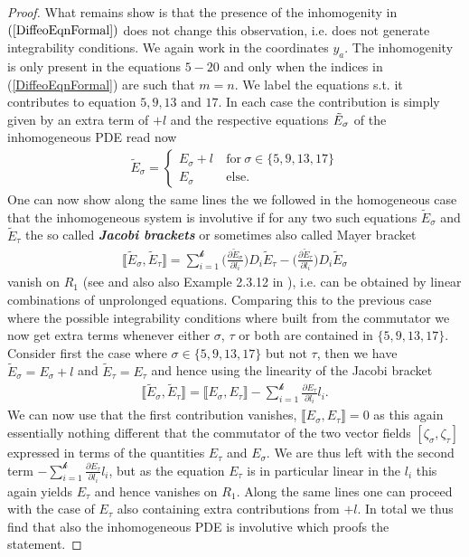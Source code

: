 \documentclass[a4paper,12pt, DIV=14, BCOR=5mm, twoside, headsepline, numbers=noenddot]{scrbook}
\begin{document}
\begin{proof}
What remains show is that the presence of the inhomogenity in $(\ref{DiffeoEqnFormal})$ does not change this observation, i.e. does not generate integrability conditions. We again work in the coordinates $y_a$. The inhomogenity is only present in the equations $5-20$ and only when the indices in (\ref{DiffeoEqnFormal}) are such that $m = n$. We label the equations s.t. it contributes to equation $5,9,13$ and $17$. In each case the contribution is simply given by an extra term of $+l$ and the respective equations $\Tilde{E}_{\sigma}$ of the inhomogeneous PDE read now 
\begin{align}
     \tilde{E}_{\sigma} = \begin{cases}
     E_{\sigma} + l \ &\text{for} \ \sigma \in \{ 5,9,13,17 \}\\
     E_{\sigma} \ &\text{else}.
     \end{cases}
\end{align}
One can now show along the same lines the we followed in the homogeneous case that the inhomogeneous system is involutive if for any two such equations $\tilde{E}_{\sigma}$ and $\tilde{E}_{\tau}$ the so called \textit{\textbf{Jacobi brackets}} or sometimes also called Mayer bracket 
\begin{align}
  \llbracket \tilde{E}_{\sigma}, \tilde{E}_{\tau} \rrbracket = \sum _{i = 1}^{\mathcal{k}} \biggl(\frac{\partial \tilde{E}_{\sigma}}{\partial l_i}\biggr) D_{i}\tilde{E}_{\tau} -  \biggl(\frac{\partial \tilde{E}_{\tau}}{\partial l_i}\biggr) D_{i}\tilde{E}_{\sigma} 
\end{align}
vanish on $R_1$ (see  \cite{seiler1994analysis} and also also Example 2.3.12 in \cite{seiler2009involution}), i.e. can be obtained by linear combinations of unprolonged equations. Comparing this to the previous case where the possible integrability conditions where built from the commutator we now get extra terms whenever either $\sigma$, $\tau$ or both are contained in $\{ 5,9,13,17 \}$. Consider first the case where $\sigma \in \{5,9,13,17\}$ but not $\tau$, then we have $\tilde{E}_{\sigma} = E_{\sigma} + l$ and $\tilde{E}_{\tau} = E_{\tau}$ and hence using the linearity of the Jacobi bracket
\begin{align}
    \llbracket \tilde{E}_{\sigma}, \tilde{E}_{\tau} \rrbracket = \llbracket E_{\sigma}, E_{\tau} \rrbracket - \sum_{i=1}^{\mathcal{k}} \frac{\partial E_{\tau}}{\partial l_i} l_i.
\end{align}
We can now use that the first contribution vanishes, $\llbracket E_{\sigma}, E_{\tau} \rrbracket = 0$ as this again essentially nothing different that the commutator of the two vector fields $[\zeta_{\sigma},\zeta_{\tau}]$ expressed in terms of the quantities $E_{\tau}$ and $E_{\sigma}$. We are thus left with the second term $- \sum_{i=1}^{\mathcal{k}} \frac{\partial E_{\tau}}{\partial l_i} l_i$, but as the equation $E_{\tau}$ is in particular linear in the $l_i$ this again yields $E_{\tau}$ and hence vanishes on $R_1$. Along the same lines one can proceed with the case of $E_{\tau}$ also containing extra contributions from $+l$. In total we thus find that also the inhomogeneous PDE is involutive which proofs the statement.
\end{proof}
\end{document}
